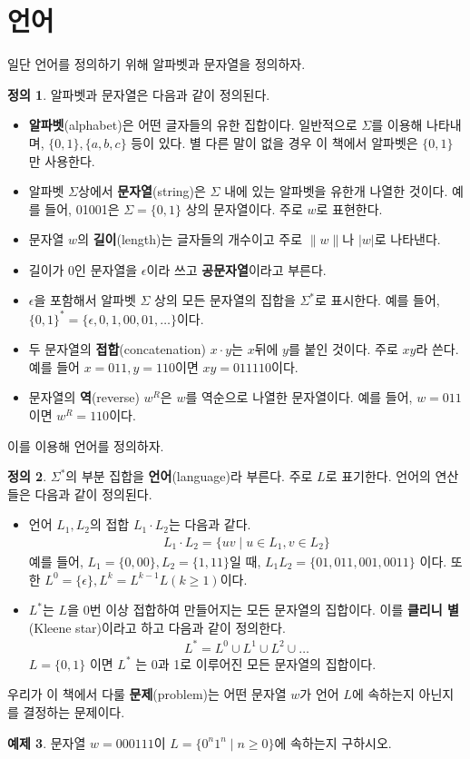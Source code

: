\documentclass[b5paper, 11pt]{book}
\theoremstyle{definition}
\newtheorem{defn}{정의}[chapter]
\newtheorem{ex}[defn]{예제}
\begin{document}
\section{언어}
일단 언어를 정의하기 위해 알파벳과 문자열을 정의하자.
\begin{defn}
    알파벳과 문자열은 다음과 같이 정의된다.
    \begin{itemize}
        \item \textbf{알파벳}(alphabet)은 어떤 글자들의 유한 집합이다. 일반적으로 $\Sigma$를 이용해 나타내며, $\{0, 1\}, \{a, b, c\}$ 등이 있다. 별 다른 말이 없을 경우 이 책에서 알파벳은 $\{0, 1\}$만 사용한다. 
        \item 알파벳 $\Sigma$상에서 \textbf{문자열}(string)은 $\Sigma$ 내에 있는 알파벳을 유한개 나열한 것이다. 예를 들어, 01001은 $\Sigma = \{0, 1\}$ 상의 문자열이다. 주로 $w$로 표현한다. 
        \item 문자열 $w$의 \textbf{길이}(length)는 글자들의 개수이고 주로 $\| w \|$나 $\vert w \vert$로 나타낸다.
        \item 길이가 0인 문자열을 $\epsilon$이라 쓰고 \textbf{공문자열}이라고 부른다. 
        \item $\epsilon$을 포함해서 알파벳 $\Sigma$ 상의 모든 문자열의 집합을 $\Sigma^*$로 표시한다. 예를 들어, $\{0, 1\}^{*} = \{\epsilon , 0, 1, 00, 01 , \ldots \}$이다.
        \item 두 문자열의 \textbf{접합}(concatenation) $x \cdot y$는 $x$뒤에 $y$를 붙인 것이다. 주로 $xy$라 쓴다. 예를 들어 $x = 011, y = 110$이면 $xy = 011110$이다. 
        \item 문자열의 \textbf{역}(reverse) $w^R$은 $w$를 역순으로 나열한 문자열이다. 예를 들어, $w=011$이면 $w^R=110$이다.
    \end{itemize}
\end{defn}
이를 이용해 언어를 정의하자.
\begin{defn}
$\Sigma^*$의 부분 집합을 \textbf{언어}(language)라 부른다. 주로 $L$로 표기한다. 언어의 연산들은 다음과 같이 정의된다.
\begin{itemize}
    \item 언어 $L_1, L_2$의 접합 $L_1 \cdot L_2$는 다음과 같다.
    \begin{align*}
       L_1 \cdot L_2 = \{uv \;\vert\; u \in L_1, v \in L_2\} 
    \end{align*}
    예를 들어, $L_1 = \{0, 00\}, L_2 = \{1, 11\}$일 때, $L_1 L_2 = \{01, 011, 001, 0011\}$ 이다. 또한 $L^0 = \{ \epsilon\}, L^{k} = L^{k-1} L (k \ge 1)$이다.  
    \item $L^*$는 $L$을 0번 이상 접합하여 만들어지는 모든 문자열의 집합이다. 이를 \textbf{클리니 별}(Kleene star)이라고 하고 다음과 같이 정의한다.
    \begin{align*}
        L^* = L^0 \cup L^1 \cup L^2 \cup \ldots 
    \end{align*}
    $L = \{0, 1\}$ 이면 $L^*$ 는 0과 1로 이루어진 모든 문자열의 집합이다. 
\end{itemize}
\end{defn}
우리가 이 책에서 다룰 \textbf{문제}(problem)는 어떤 문자열 $w$가 언어 $L$에 속하는지 아닌지를 결정하는 문제이다.
\begin{ex}
    문자열 $w = 000111$이 $L = \{0^n 1^n \;\vert\; n \ge 0\}$에 속하는지 구하시오.
\end{ex}
\end{document}
